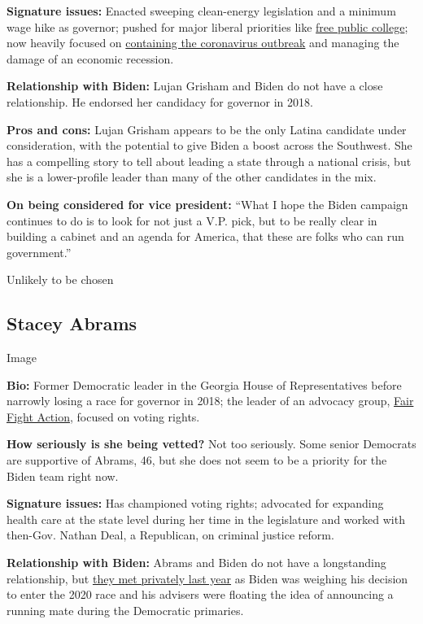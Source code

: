 \textbf{Signature issues:} Enacted sweeping clean-energy legislation and
a minimum wage hike as governor; pushed for major liberal priorities
like
\href{https://www.nytimes.com/2019/09/18/us/new-mexico-free-college-tuition.html}{free
public college}; now heavily focused on
\href{https://www.nytimes.com/2020/04/24/us/coronavirus-new-mexico.html}{containing
the coronavirus outbreak} and managing the damage of an economic
recession.

\textbf{Relationship with Biden:} Lujan Grisham and Biden do not have a
close relationship. He endorsed her candidacy for governor in 2018.

\textbf{Pros and cons:} Lujan Grisham appears to be the only Latina
candidate under consideration, with the potential to give Biden a boost
across the Southwest. She has a compelling story to tell about leading a
state through a national crisis, but she is a lower-profile leader than
many of the other candidates in the mix.

\textbf{On being considered for vice president:} ``What I hope the Biden
campaign continues to do is to look for not just a V.P. pick, but to be
really clear in building a cabinet and an agenda for America, that these
are folks who can run government.''

Unlikely to be chosen

\hypertarget{stacey-abrams}{%
\subsection{Stacey Abrams}\label{stacey-abrams}}

Image

\textbf{Bio:} Former Democratic leader in the Georgia House of
Representatives before narrowly losing a race for governor in 2018; the
leader of an advocacy group,
\href{https://www.nytimes.com/2019/08/13/us/politics/stacey-abrams-fair-fight-2020.html}{Fair
Fight Action}, focused on voting rights.

\textbf{How seriously is she being vetted?} Not too seriously. Some
senior Democrats are supportive of Abrams, 46, but she does not seem to
be a priority for the Biden team right now.

\textbf{Signature issues:} Has championed voting rights; advocated for
expanding health care at the state level during her time in the
legislature and worked with then-Gov. Nathan Deal, a Republican, on
criminal justice reform.

\textbf{Relationship with Biden:} Abrams and Biden do not have a
longstanding relationship, but
\href{https://www.nytimes.com/2019/03/21/us/politics/joe-biden-2020-election.html}{they
met privately last year} as Biden was weighing his decision to enter the
2020 race and his advisers were floating the idea of announcing a
running mate during the Democratic primaries.

